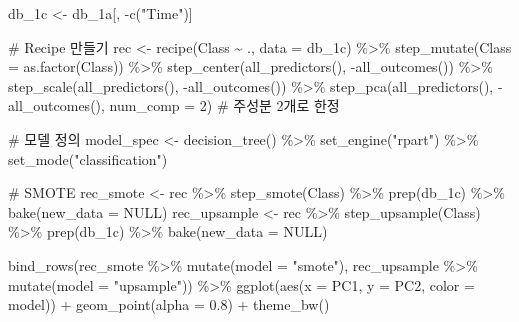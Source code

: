 \documentclass[
  letterpaper,
  DIV=11,
  numbers=noendperiod]{scrreprt}
\newenvironment{Shaded}{\begin{snugshade}}{\end{snugshade}}
\newcommand{\AttributeTok}[1]{\textcolor[rgb]{0.40,0.45,0.13}{#1}}
\newcommand{\CommentTok}[1]{\textcolor[rgb]{0.37,0.37,0.37}{#1}}
\newcommand{\ConstantTok}[1]{\textcolor[rgb]{0.56,0.35,0.01}{#1}}
\newcommand{\DecValTok}[1]{\textcolor[rgb]{0.68,0.00,0.00}{#1}}
\newcommand{\FloatTok}[1]{\textcolor[rgb]{0.68,0.00,0.00}{#1}}
\newcommand{\FunctionTok}[1]{\textcolor[rgb]{0.28,0.35,0.67}{#1}}
\newcommand{\NormalTok}[1]{\textcolor[rgb]{0.00,0.23,0.31}{#1}}
\newcommand{\OtherTok}[1]{\textcolor[rgb]{0.00,0.23,0.31}{#1}}
\newcommand{\SpecialCharTok}[1]{\textcolor[rgb]{0.37,0.37,0.37}{#1}}
\newcommand{\StringTok}[1]{\textcolor[rgb]{0.13,0.47,0.30}{#1}}
\begin{document}
\begin{Shaded}
\begin{Highlighting}[]
\NormalTok{db\_1c }\OtherTok{\textless{}{-}}\NormalTok{ db\_1a[, }\SpecialCharTok{{-}}\FunctionTok{c}\NormalTok{(}\StringTok{"Time"}\NormalTok{)]}

\CommentTok{\# Recipe 만들기}
\NormalTok{rec }\OtherTok{\textless{}{-}} \FunctionTok{recipe}\NormalTok{(Class }\SpecialCharTok{\textasciitilde{}}\NormalTok{ ., }\AttributeTok{data =}\NormalTok{ db\_1c) }\SpecialCharTok{\%\textgreater{}\%}
  \FunctionTok{step\_mutate}\NormalTok{(}\AttributeTok{Class =} \FunctionTok{as.factor}\NormalTok{(Class)) }\SpecialCharTok{\%\textgreater{}\%}
  \FunctionTok{step\_center}\NormalTok{(}\FunctionTok{all\_predictors}\NormalTok{(),  }\SpecialCharTok{{-}}\FunctionTok{all\_outcomes}\NormalTok{()) }\SpecialCharTok{\%\textgreater{}\%}
  \FunctionTok{step\_scale}\NormalTok{(}\FunctionTok{all\_predictors}\NormalTok{(),  }\SpecialCharTok{{-}}\FunctionTok{all\_outcomes}\NormalTok{()) }\SpecialCharTok{\%\textgreater{}\%}
  \FunctionTok{step\_pca}\NormalTok{(}\FunctionTok{all\_predictors}\NormalTok{(),  }\SpecialCharTok{{-}}\FunctionTok{all\_outcomes}\NormalTok{(), }\AttributeTok{num\_comp =} \DecValTok{2}\NormalTok{) }\CommentTok{\# 주성분 2개로 한정}

\CommentTok{\# 모델 정의}
\NormalTok{model\_spec }\OtherTok{\textless{}{-}} \FunctionTok{decision\_tree}\NormalTok{() }\SpecialCharTok{\%\textgreater{}\%}
  \FunctionTok{set\_engine}\NormalTok{(}\StringTok{"rpart"}\NormalTok{) }\SpecialCharTok{\%\textgreater{}\%}
  \FunctionTok{set\_mode}\NormalTok{(}\StringTok{"classification"}\NormalTok{)}

\CommentTok{\# SMOTE}
\NormalTok{rec\_smote }\OtherTok{\textless{}{-}}\NormalTok{ rec }\SpecialCharTok{\%\textgreater{}\%} \FunctionTok{step\_smote}\NormalTok{(Class) }\SpecialCharTok{\%\textgreater{}\%} \FunctionTok{prep}\NormalTok{(db\_1c) }\SpecialCharTok{\%\textgreater{}\%} \FunctionTok{bake}\NormalTok{(}\AttributeTok{new\_data =} \ConstantTok{NULL}\NormalTok{)}
\NormalTok{rec\_upsample }\OtherTok{\textless{}{-}}\NormalTok{ rec }\SpecialCharTok{\%\textgreater{}\%} \FunctionTok{step\_upsample}\NormalTok{(Class) }\SpecialCharTok{\%\textgreater{}\%} \FunctionTok{prep}\NormalTok{(db\_1c) }\SpecialCharTok{\%\textgreater{}\%} \FunctionTok{bake}\NormalTok{(}\AttributeTok{new\_data =} \ConstantTok{NULL}\NormalTok{)}

\FunctionTok{bind\_rows}\NormalTok{(rec\_smote }\SpecialCharTok{\%\textgreater{}\%} \FunctionTok{mutate}\NormalTok{(}\AttributeTok{model =} \StringTok{"smote"}\NormalTok{),}
\NormalTok{          rec\_upsample }\SpecialCharTok{\%\textgreater{}\%} \FunctionTok{mutate}\NormalTok{(}\AttributeTok{model =} \StringTok{"upsample"}\NormalTok{)) }\SpecialCharTok{\%\textgreater{}\%}
  \FunctionTok{ggplot}\NormalTok{(}\FunctionTok{aes}\NormalTok{(}\AttributeTok{x =}\NormalTok{ PC1, }\AttributeTok{y =}\NormalTok{ PC2, }\AttributeTok{color =}\NormalTok{ model)) }\SpecialCharTok{+}
  \FunctionTok{geom\_point}\NormalTok{(}\AttributeTok{alpha =} \FloatTok{0.8}\NormalTok{) }\SpecialCharTok{+}
  \FunctionTok{theme\_bw}\NormalTok{()}
\end{Highlighting}
\end{Shaded}
\end{document}
